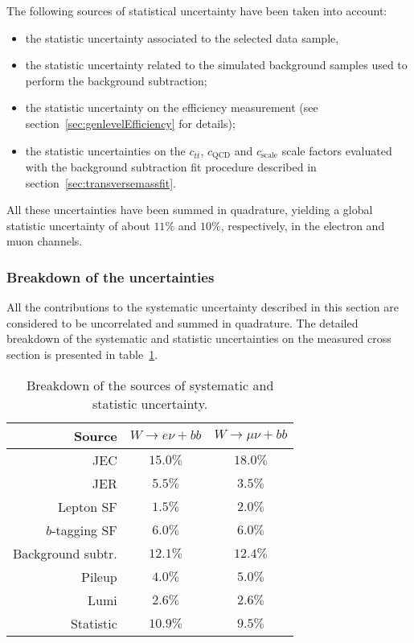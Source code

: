 The following sources of statistical uncertainty have been taken into account: 
\begin{itemize}
  \item the statistic uncertainty associated to the selected data sample,
  \item the statistic uncertainty related to the simulated background samples 
    used to perform the background subtraction;
  \item the statistic uncertainty on the efficiency measurement 
    (see section~\ref{sec:genlevelEfficiency} for details);
  \item the statistic uncertainties on the $c_{t\bar{t}}$, 
    $c_{\mathrm{QCD}}$ and $c_{\mathrm{scale}}$ scale factors evaluated with 
    the background subtraction fit procedure described in section~\ref{sec:transversemassfit}.
\end{itemize}
All these uncertainties have been summed in quadrature, yielding a global statistic 
uncertainty of about $11\%$ and $10\%$, respectively, 
in the electron and muon channels.

\subsubsection{Breakdown of the uncertainties}

All the contributions to the systematic uncertainty described in this section are considered 
to be uncorrelated and summed in quadrature.
The detailed breakdown of the systematic and statistic uncertainties on the measured
cross section is presented in
table~\ref{tab:finalxsectab}.

\begin{table}[htb]
\begin{center}
\begin{tabular}{|r|c|c|}
\hline
\textbf{Source} & $W \rightarrow e \nu + bb$ & $W \rightarrow \mu \nu + bb$ \\ 
\hline
JEC                & $15.0\%$  & $18.0\%$ \\ 
JER                & $5.5\%$   & $3.5\%$ \\ 
Lepton SF          & $1.5\%$   & $2.0\%$ \\ 
$b$-tagging SF     & $6.0\%$   & $6.0\%$ \\ 
Background subtr.  & $12.1\%$  & $12.4\%$ \\ 
Pileup             & $4.0\%$   & $5.0\%$ \\ 
Lumi               & $2.6\%$   & $2.6\%$ \\ 
\hline \hline
Statistic          & $10.9\%$   & $9.5\%$ \\ 
\hline
\end{tabular}
\end{center}
\caption{Breakdown of the sources of systematic and statistic uncertainty.} 
\label{tab:finalxsectab}
\end{table}



